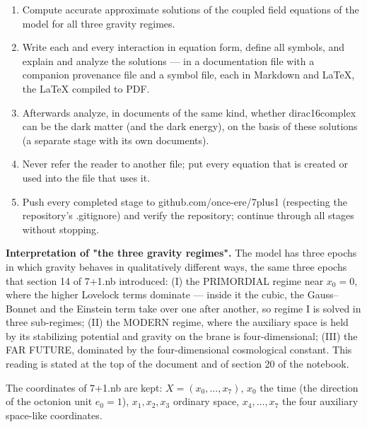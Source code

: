 \documentclass[10pt,a4paper]{article}
\begin{document}
\begin{enumerate}
\item Compute accurate approximate solutions of the coupled field equations of the model for all three gravity regimes.
\item Write each and every interaction in equation form, define all symbols, and explain and analyze the solutions — in a documentation file with a companion provenance file and a symbol file, each in Markdown and LaTeX, the LaTeX compiled to PDF.
\item Afterwards analyze, in documents of the same kind, whether dirac16complex can be the dark matter (and the dark energy), on the basis of these solutions (a separate stage with its own documents).
\item Never refer the reader to another file; put every equation that is created or used into the file that uses it.
\item Push every completed stage to github.com/once-ere/7plus1 (respecting the repository’s .gitignore) and verify the repository; continue through all stages without stopping.
\end{enumerate}
\textbf{Interpretation of "the three gravity regimes".} The model has three epochs in which gravity behaves in qualitatively different ways, the same three epochs that section 14 of 7+1.nb introduced: (I) the PRIMORDIAL regime near $x_0=0$, where the higher Lovelock terms dominate — inside it the cubic, the Gauss–Bonnet and the Einstein term take over one after another, so regime I is solved in three sub-regimes; (II) the MODERN regime, where the auxiliary space is held by its stabilizing potential and gravity on the brane is four-dimensional; (III) the FAR FUTURE, dominated by the four-dimensional cosmological constant. This reading is stated at the top of the document and of section 20 of the notebook.

The coordinates of 7+1.nb are kept: $X=(x_0,\dots,x_7)$, $x_0$ the time (the direction of the octonion unit $e_0=1$), $x_1,x_2,x_3$ ordinary space, $x_4,\dots,x_7$ the four auxiliary space-like coordinates.
\end{document}
